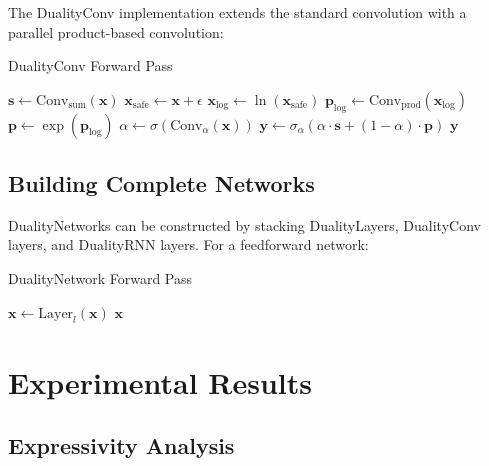 \documentclass{article}
\begin{document}
The DualityConv implementation extends the standard convolution with a parallel product-based convolution:

\begin{algorithm}
\caption{DualityConv Forward Pass}
\begin{algorithmic}[1]
    \State $\mathbf{s} \gets \text{Conv}_{\text{sum}}(\mathbf{x})$ 
    \State $\mathbf{x}_{\text{safe}} \gets \mathbf{x} + \epsilon$ 
    \State $\mathbf{x}_{\text{log}} \gets \ln(\mathbf{x}_{\text{safe}})$ 
    \State $\mathbf{p}_{\text{log}} \gets \text{Conv}_{\text{prod}}(\mathbf{x}_{\text{log}})$ 
    \State $\mathbf{p} \gets \exp(\mathbf{p}_{\text{log}})$ 
    \State $\alpha \gets \sigma(\text{Conv}_{\alpha}(\mathbf{x}))$ 
    \State $\mathbf{y} \gets \sigma_\alpha(\alpha \cdot \mathbf{s} + (1-\alpha) \cdot \mathbf{p})$ 
    \State \Return $\mathbf{y}$
\EndFunction
\end{algorithmic}
\end{algorithm}

\subsection{Building Complete Networks}

DualityNetworks can be constructed by stacking DualityLayers, DualityConv layers, and DualityRNN layers. For a feedforward network:

\begin{algorithm}
\caption{DualityNetwork Forward Pass}
\begin{algorithmic}[1]
        \State $\mathbf{x} \gets \text{Layer}_l(\mathbf{x})$ 
    \EndFor
    \State \Return $\mathbf{x}$
\EndFunction
\end{algorithmic}
\end{algorithm}

\section{Experimental Results}

\subsection{Expressivity Analysis}
\end{document}
